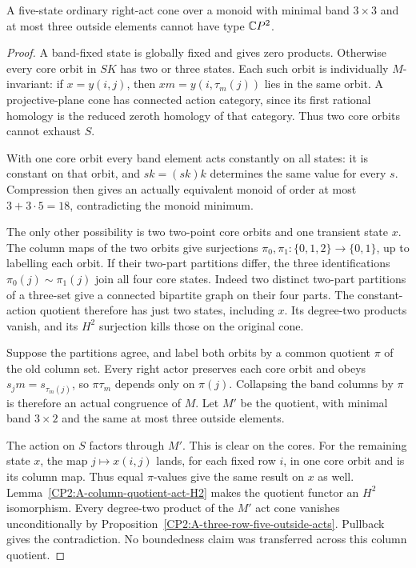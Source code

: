 \begin{lemma}
\label{CP2:A-three-by-three-five-state}
A five-state ordinary right-act cone over a monoid
with minimal band $3\times3$ and at most three outside
elements cannot have type $\mathbb{C}P^2$.
\end{lemma}
\begin{proof}
A band-fixed state is globally fixed and gives zero
products. Otherwise every core orbit in $SK$ has
two or three states. Each such orbit is individually
$M$-invariant: if $x=y(i,j)$, then
$xm=y(i,\tau_m(j))$ lies in the same orbit.
A projective-plane cone has connected action category,
since its first rational homology is the reduced
zeroth homology of that category. Thus two core orbits
cannot exhaust $S$.

With one core orbit every band element acts constantly
on all states: it is constant on that orbit, and
$sk=(sk)k$ determines the same value for every $s$.
Compression then gives an actually equivalent monoid
of order at most $3+3\cdot5=18$, contradicting the
monoid minimum.

The only other possibility is two two-point core
orbits and one transient state $x$. The column maps
of the two orbits give surjections
$\pi_0,\pi_1:\{0,1,2\}\to\{0,1\}$, up to labelling
each orbit. If their two-part partitions differ,
the three identifications
$\pi_0(j)\sim\pi_1(j)$ join all four core states.
Indeed two distinct two-part partitions of a three-set
give a connected bipartite graph on their four parts.
The constant-action quotient therefore has just two
states, including $x$. Its degree-two products vanish,
and its $H^2$ surjection kills those on the original cone.

Suppose the partitions agree, and label both orbits
by a common quotient $\pi$ of the old column set.
Every right actor preserves each core orbit and obeys
$s_jm=s_{\tau_m(j)}$, so $\pi\tau_m$ depends only on
$\pi(j)$. Collapsing the band columns by $\pi$ is
therefore an actual congruence of $M$. Let $M'$ be
the quotient, with minimal band $3\times2$ and the
same at most three outside elements.

The action on $S$ factors through $M'$. This is clear
on the cores. For the remaining state $x$, the map
$j\mapsto x(i,j)$ lands, for each fixed row $i$, in
one core orbit and is its column map. Thus equal
$\pi$-values give the same result on $x$ as well.
Lemma~\ref{CP2:A-column-quotient-act-H2} makes the
quotient functor an $H^2$ isomorphism.
Every degree-two product of the $M'$ act cone vanishes
unconditionally by
Proposition~\ref{CP2:A-three-row-five-outside-acts}.
Pullback gives the contradiction. No boundedness
claim was transferred across this column quotient.
\end{proof}

